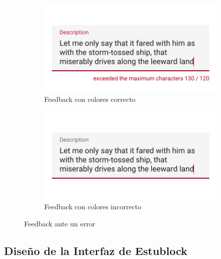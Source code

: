\begin{figure}[hbt]
	\centering
	\begin{subfigure}[b]{0.4\linewidth}
		\centering
        \includegraphics[width=1\linewidth]{figs/Desarrollo/Accesibilidad/errorbien}
        \caption[Feedback con colores correcto]{Feedback con colores correcto}
	\end{subfigure} 
	\begin{subfigure}[b]{0.4\linewidth}
		\centering
        \includegraphics[width=1\linewidth]{figs/Desarrollo/Accesibilidad/errormal}
        \caption[Feedback con colores incorrecto]{Feedback con colores incorrecto}
	\end{subfigure} 
	\caption[Feedback ante un error]{Feedback ante un error}
	\label{fig:error}
\end{figure}

\subsection{Diseño de la Interfaz de Estublock}

